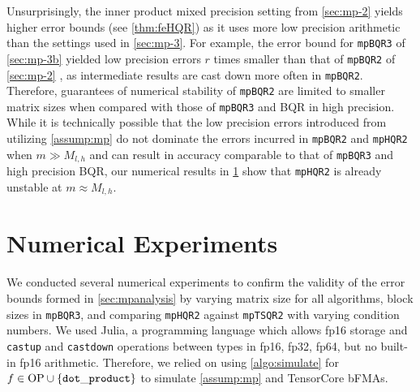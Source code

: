\documentclass[review,onefignum,onetabnum]{siamart190516}
\begin{document}
Unsurprisingly, the inner product mixed precision setting from \cref{sec:mp-2} yields higher error bounds (see \cref{thm:feHQR}) as it uses more low precision arithmetic than the settings used in \cref{sec:mp-3}. 
For example, the error bound for {\tt mpBQR3} of \cref{sec:mp-3b} yielded low precision errors $r$ times smaller than that of {\tt mpBQR2} of \cref{sec:mp-2} , as intermediate results are cast down more often in {\tt mpBQR2}.
Therefore, guarantees of numerical stability of {\tt mpBQR2} are limited to smaller matrix sizes when compared with those of {\tt mpBQR3} and BQR in high precision.
While it is technically possible that the low precision errors introduced from utilizing \cref{assump:mp} do not dominate the errors incurred in {\tt mpBQR2} and {\tt mpHQR2} when $m\gg M_{l,h}$ and can result in accuracy comparable to that of {\tt mpBQR3} and high precision BQR, our numerical results in \cref{sec:NE} show that {\tt mpHQR2} is already unstable at $m\approx M_{l,h}$.

\section{Numerical Experiments}\label{sec:NE}
%
We conducted several numerical experiments to confirm the validity of the error bounds formed in \cref{sec:mpanalysis} by varying matrix size for all algorithms, block sizes in {\tt mpBQR3}, and comparing {\tt mpHQR2} against {\tt mpTSQR2} with varying condition numbers.
We used Julia, a programming language which allows fp16 storage and {\tt castup} and {\tt castdown} operations between types in {fp16, fp32, fp64}, but no built-in fp16 arithmetic.
Therefore, we relied on using \cref{algo:simulate} for $f\in \text{OP} \cup\{{\tt dot\_product}\}$ to simulate \cref{assump:mp} and TensorCore bFMAs.\par
\end{document}
